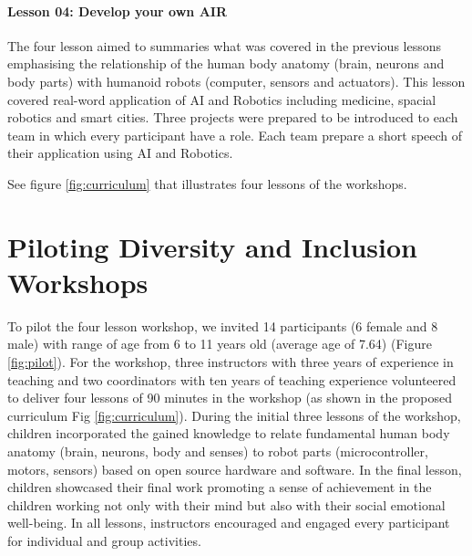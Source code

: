 \documentclass[conference]{IEEEtran}
\begin{document}
\paragraph{Lesson 04: Develop your own AIR}
The four lesson aimed to summaries what was covered in the previous lessons emphasising the relationship of the human body anatomy (brain, neurons and body parts) with humanoid robots (computer, sensors and actuators).
This lesson covered real-word application of AI and Robotics including medicine, spacial robotics and smart cities. 
Three projects were prepared to be introduced to each team in which every participant have a role. 
Each team prepare a short speech of their application using AI and Robotics. 

See figure \ref{fig:curriculum} that illustrates four lessons of the workshops.



\section{Piloting Diversity and Inclusion Workshops}
To pilot the four lesson workshop, we invited 14 participants (6 female and 8 male) with range of age from 6 to 11 years old (average age of 7.64) (Figure \ref{fig:pilot}). 
For the workshop, three instructors with three years of experience in teaching and two coordinators with ten years of teaching experience volunteered to deliver four lessons of 90 minutes in the workshop (as shown in the proposed curriculum Fig \ref{fig:curriculum}).
During the initial three lessons of the workshop, children incorporated the gained knowledge to relate fundamental human body anatomy (brain, neurons, body and senses) to robot parts (microcontroller, motors, sensors) based on open source hardware and software.
In the final lesson, children showcased their final work promoting a sense of achievement in the children working not only with their mind but also with their social emotional well-being. 
In all lessons, instructors encouraged and engaged every participant for individual and group activities.
\end{document}
